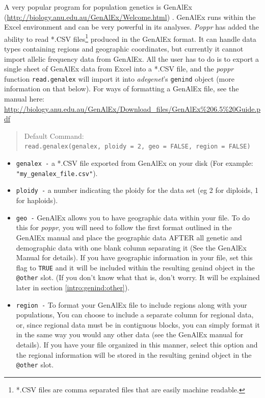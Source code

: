 \documentclass[letterpaper]{article}
\newcommand{\tab}{\hspace*{1em}}
\begin{document}
\tab\tab A very popular program for population genetics is GenAlEx (\url{http://biology.anu.edu.au/GenAlEx/Welcome.html}) \cite{Peakall:2012, Peakall:2006}. GenAlEx runs within the Excel environment and can be very powerful in its analyses. \textit{Poppr} has added the ability to read *.CSV files\footnote{*.CSV files are comma separated files that are easily machine readable.} produced in the GenAlEx format. It can handle data types containing regions and geographic coordinates, but currently it cannot import allelic frequency data from GenAlEx. All the user has to do is to export a single sheet of GenAlEx data from Excel into a *.CSV file, and the \textit{poppr} function \texttt{read.genalex} will import it into \textit{adegenet}'s \texttt{genind} object (more information on that below). For ways of formatting a GenAlEx file, see the manual here: \url{http://biology.anu.edu.au/GenAlEx/Download_files/GenAlEx\%206.5\%20Guide.pdf}
\begin{quote}
Default Command:\\
\texttt{read.genalex(genalex, ploidy = 2, geo = FALSE, region = FALSE)}
\end{quote}
\begin{itemize}
  \item \texttt{genalex -} a *.CSV file exported from GenAlEx on your disk (For example: \texttt{"my\_genalex\_file.csv"}).
  \item \texttt{ploidy -} a number indicating the ploidy for the data set (eg 2 for diploids, 1 for haploids).
  \item \texttt{geo -} GenAlEx allows you to have geographic data within your file. To do this for \textit{poppr}, you will need to follow the first format outlined in the GenAlEx manual and place the geographic data AFTER all genetic and demographic data with one blank column separating it (See the GenAlEx Manual for details). If you have geographic information in your file, set this flag to \texttt{TRUE} and it will be included within the resulting genind object in the \texttt{@other} slot. (If you don't know what that is, don't worry. It will be explained later in section \ref{intro:genind:other}).
  \item \texttt{region -} To format your GenAlEx file to include regions along with your populations, You can choose to include a separate column for regional data, or, since regional data must be in contiguous blocks, you can simply format it in the same way you would any other data (see the GenAlEx manual for details). If you have your file organized in this manner, select this option and the regional information will be stored in the resulting genind object in the \texttt{@other} slot.
\end{itemize}
\end{document}
